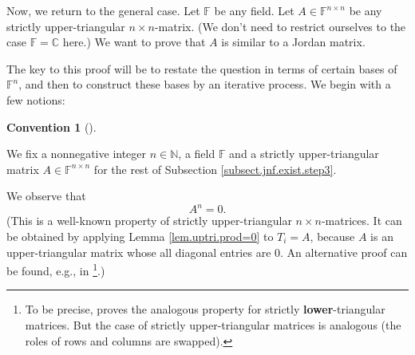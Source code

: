 \documentclass[numbers=enddot,12pt,final,onecolumn,notitlepage]{scrartcl}%
\numberwithin{exer}{subsection}
\theoremstyle{definition}
\newtheorem{conv}[theo]{Convention}
\newenvironment{convention}[1][]
{\begin{conv}[#1]\begin{leftbar}}
{\end{leftbar}\end{conv}}
\begin{document}
Now, we return to the general case. Let $\mathbb{F}$ be any field. Let
$A\in\mathbb{F}^{n\times n}$ be any strictly upper-triangular $n\times
n$-matrix. (We don't need to restrict ourselves to the case $\mathbb{F}%
=\mathbb{C}$ here.) We want to prove that $A$ is similar to a Jordan matrix.

The key to this proof will be to restate the question in terms of certain
bases of $\mathbb{F}^{n}$, and then to construct these bases by an iterative
process. We begin with a few notions:

\begin{convention}
We fix a nonnegative integer $n\in\mathbb{N}$, a field $\mathbb{F}$ and a
strictly upper-triangular matrix $A\in\mathbb{F}^{n\times n}$ for the rest of
Subsection \ref{subsect.jnf.exist.step3}.
\end{convention}

We observe that%
\begin{equation}
A^{n}=0. \label{eq.jnf.exist.step3.An=0}%
\end{equation}
(This is a well-known property of strictly upper-triangular $n\times
n$-matrices. It can be obtained by applying Lemma \ref{lem.uptri.prod=0} to
$T_{i}=A$, because $A$ is an upper-triangular matrix whose all diagonal
entries are $0$. An alternative proof can be found, e.g., in \cite[Corollary
3.78]{lina}\footnote{To be precise, \cite[Corollary 3.78]{lina} proves the
analogous property for strictly \textbf{lower}-triangular matrices. But the
case of strictly upper-triangular matrices is analogous (the roles of rows and
columns are swapped).}.)
\end{document}
